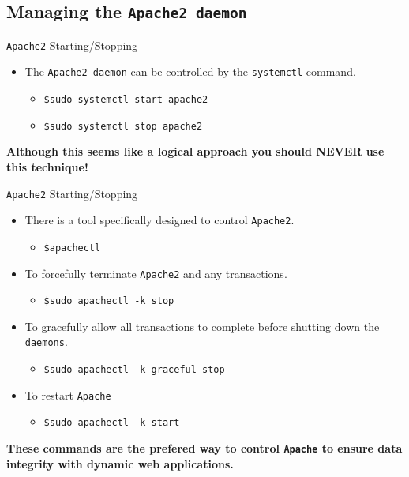 \documentclass[xcolor=table]{beamer}
\begin{document}
\subsection{Managing the \texttt{Apache2 daemon}}
\begin{frame}{\texttt{Apache2} Starting/Stopping}
  \begin{itemize}
    \item The \texttt{Apache2 daemon} can be controlled by the \texttt{systemctl} command.
      \begin{itemize}
        \item \texttt{\$sudo systemctl start apache2}
        \item \texttt{\$sudo systemctl stop apache2}
      \end{itemize}
  \end{itemize}
  \begin{tcolorbox}
    \begin{center}
      \scriptsize \textbf{Although this seems like a logical approach you should NEVER use this technique!}
    \end{center}
  \end{tcolorbox}
\end{frame}

\begin{frame}{\texttt{Apache2} Starting/Stopping}
  \begin{itemize}
    \item There is a tool specifically designed to control \texttt{Apache2}.
      \begin{itemize}
        \item \texttt{\$apachectl}
      \end{itemize}
    \item To forcefully terminate \texttt{Apache2} and any transactions.
      \begin{itemize}
        \item \texttt{\$sudo apachectl -k stop}
      \end{itemize}
    \item To gracefully allow all transactions to complete before shutting down the \texttt{daemons}. 
      \begin{itemize}
        \item \texttt{\$sudo apachectl -k graceful-stop}
      \end{itemize}
    \item To restart \texttt{Apache}
      \begin{itemize}
        \item \texttt{\$sudo apachectl -k start}
      \end{itemize}
  \end{itemize}
  \begin{tcolorbox}
    \begin{center}
      \scriptsize \textbf{These commands are the prefered way to control \texttt{Apache} to ensure data integrity with dynamic web applications.}
    \end{center}
  \end{tcolorbox}
\end{frame}
\end{document}
